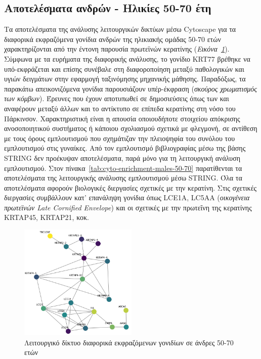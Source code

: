 \documentclass[12pt]{report}
\begin{document}
        \subsection{Αποτελέσματα ανδρών - Ηλικίες 50-70 έτη}
            Τα αποτελέσματα της ανάλυσης λειτουργικών δικτύων μέσω Cytoscape για τα διαφορικά εκφραζόμενα γονίδια ανδρών της ηλικιακής ομάδας 50-70 ετών χαρακτηρίζονται από την έντονη παρουσία πρωτεϊνών κερατίνης (\emph{Εικόνα~\ref{fig:cyto_males_keratin_50_70}}). Σύμφωνα με τα ευρήματα της διαφορικής ανάλυσης, το γονίδιο KRT77 βρέθηκε να υπό-εκφράζεται και επίσης συνέβαλε στη διαφοροποίηση μεταξύ παθολογικών και υγιών δειγμάτων στην εφαρμογή ταξινόμησης μηχανικής μάθησης. Παραδόξως, τα παρακάτω απεικονιζόμενα γονίδια παρουσιάζουν υπέρ-έκφραση (\emph{σκούρος χρωματισμός των κόμβων}).  Έρευνες που έχουν αποτυπωθεί σε δημοσιεύσεις όπως των \cite{Liu2025ImpairedKeratinocytes} και \cite{Wang2022BioinformaticsDisease} αναφέρουν μεταξύ άλλων και το αντίκτυπο σε επίπεδα κερατίνης στη νόσο του Πάρκινσον. Χαρακτηριστική είναι η απουσία οποιουδήποτε στοιχείου απόκρισης ανοσοποιητικού συστήματος ή κάποιου σχολιασμού σχετικά με φλεγμονή, σε αντίθεση με τους όρους εμπλουτισμού που σχημάτιζαν την πλειοψηφία του συνόλου του εμπλουτισμού στις γυναίκες. Από τον εμπλουτισμό βιβλιογραφίας μέσω της βάσης STRING δεν προέκυψαν αποτελέσματα, παρά μόνο για τη λειτουργική ανάλυση εμπλουτισμού.         Στον πίνακα~\ref{tab:cyto-enrichment-males-50-70} παρατίθενται τα αποτελέσματα της λειτουργικής ανάλυσης εμπλουτισμού μέσω STRING. Όλα τα αποτελέσματα αφορούν βιολογικές διεργασίες σχετικές με την κερατίνη. Στις σχετικές διεργασίες συμβάλλουν κατ' επανάληψη γονίδια όπως LCE1A, LC5AA (\emph{οικογένεια πρωτεϊνών Late Cornified Envelope}) και οι σχετικές με την πρωτεΐνη της κερατίνης KRTAP45, KRTAP21, κοκ. 
            \begin{figure}[H]
                \centering
                \includegraphics[width=0.5\textwidth]{Cytoscape/Males/cyto_males_50_70_keratine.png}
                \caption{Λειτουργικό δίκτυο διαφορικά εκφραζόμενων γονιδίων σε άνδρες 50-70 ετών}
                \label{fig:cyto_males_keratin_50_70}
            \end{figure}
\end{document}
